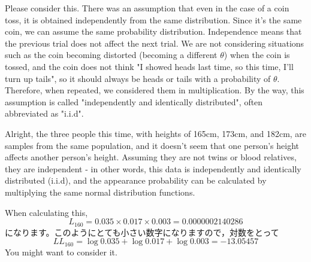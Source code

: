 \documentclass{ltjsbook}
\begin{document}
Please consider this. There was an assumption that even in the case of a coin toss, it is obtained independently from the same distribution. Since it's the same coin, we can assume the same probability distribution. Independence means that the previous trial does not affect the next trial. We are not considering situations such as the coin becoming distorted (becoming a different $\theta$) when the coin is tossed, and the coin does not think "I showed heads last time, so this time, I'll turn up tails", so it should always be heads or tails with a probability of $\theta$. Therefore, when repeated, we considered them in multiplication. By the way, this assumption is called "independently and identically distributed", often abbreviated as "i.i.d"\label{iidexample}.

Alright, the three people this time, with heights of 165cm, 173cm, and 182cm, are samples from the same population, and it doesn't seem that one person's height affects another person's height. Assuming they are not twins or blood relatives, they are independent - in other words, this data is independently and identically distributed (i.i.d), and the appearance probability can be calculated by multiplying the same normal distribution functions.

When calculating this,
\[ L_{160}=0.035 \times 0.017 \times 0.003 = 0.0000002140286 \]
になります。このようにとても小さい数字になりますので，対数をとって
\[ LL_{160} = \log 0.035 +\log 0.017 +\log 0.003 = -13.05457 \]
You might want to consider it.
\end{document}
